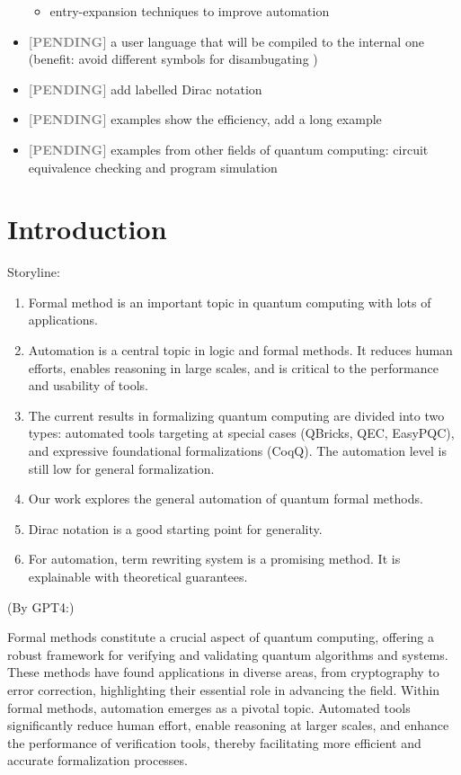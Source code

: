 \documentclass[manuscript, review, timestamp]{acmart}
\newcommand*{\pending}{\textcolor{gray}{\textbf{ [PENDING] }}}
\begin{document}
\begin{itemize}
\begin{itemize}
            \item entry-expansion techniques to improve automation
        \end{itemize}
    \item \pending a user language that will be compiled to the internal one (benefit: avoid different symbols for disambugating )
    \item \pending add labelled Dirac notation
    \item \pending examples show the efficiency, add a long example
    \item \pending examples from other fields of quantum computing: circuit equivalence checking and program simulation
\end{itemize}

\clearpage
\tableofcontents

\clearpage

\section{Introduction}
Storyline:
\begin{enumerate}
    \item Formal method is an important topic in quantum computing with lots of applications.
    \item Automation is a central topic in logic and formal methods. It reduces human efforts, enables reasoning in large scales, and is critical to the performance and usability of tools.
    \item The current results in formalizing quantum computing are divided into two types: automated tools targeting at special cases (QBricks, QEC, EasyPQC), and expressive foundational formalizations (CoqQ). The automation level is still low for general formalization.
    \item Our work explores the general automation of quantum formal methods.
    \item Dirac notation is a good starting point for generality.
    \item For automation, term rewriting system is a promising method. It is explainable with theoretical guarantees.
\end{enumerate}


(By GPT4:)

Formal methods constitute a crucial aspect of quantum computing, offering a robust framework for verifying and validating quantum algorithms and systems. These methods have found applications in diverse areas, from cryptography to error correction, highlighting their essential role in advancing the field. Within formal methods, automation emerges as a pivotal topic. Automated tools significantly reduce human effort, enable reasoning at larger scales, and enhance the performance of verification tools, thereby facilitating more efficient and accurate formalization processes.
\end{document}
